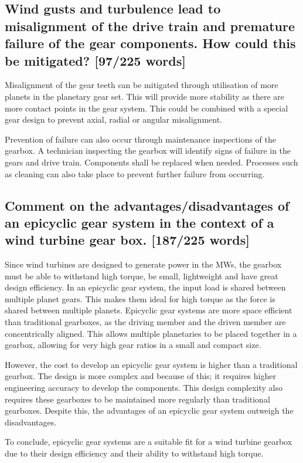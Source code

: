 \documentclass[12pt]{article}
\numberwithin{equation}{section}
\begin{document}
\begin{flushleft}
\subsection[Misalignment and failure prevention.]{Wind gusts and turbulence lead to misalignment of the drive train and premature failure of the gear components. How could this be mitigated? [97/225 words]}
Misalignment of the gear teeth can be mitigated through utilisation of more planets in the planetary gear set. This will provide more stability as there are more contact points in the gear system. This could be combined with a special gear design to prevent axial, radial or angular misalignment. 

Prevention of failure can also occur through maintenance inspections of the gearbox. A technician inspecting the gearbox will identify signs of failure in the gears and drive train. Components shall be replaced when needed. Processes such as cleaning can also take place to prevent further failure from occurring.

\subsection[Advantages/disadvantages of an epicyclic gearbox.]{Comment on the advantages/disadvantages of an epicyclic gear system in the context of a wind turbine gear box. [187/225 words]}
Since wind turbines are designed to generate power in the MWs, the gearbox must be able to withstand high torque, be small, lightweight and have great design efficiency. In an epicyclic gear system, the input load is shared between multiple planet gears. This makes them ideal for high torque as the force is shared between multiple planets. Epicyclic gear systems are more space efficient than traditional gearboxes, as the driving member and the driven member are concentrically aligned. This allows multiple planetaries to be placed together in a gearbox, allowing for very high gear ratios in a small and compact size.

However, the cost to develop an epicyclic gear system is higher than a traditional gearbox. The design is more complex and because of this; it requires higher engineering accuracy to develop the components. This design complexity also requires these gearboxes to be maintained more regularly than traditional gearboxes. Despite this, the advantages of an epicyclic gear system outweigh the disadvantages.  

To conclude, epicyclic gear systems are a suitable fit for a wind turbine gearbox due to their design efficiency and their ability to withstand high torque.


\end{flushleft}
\end{document}
